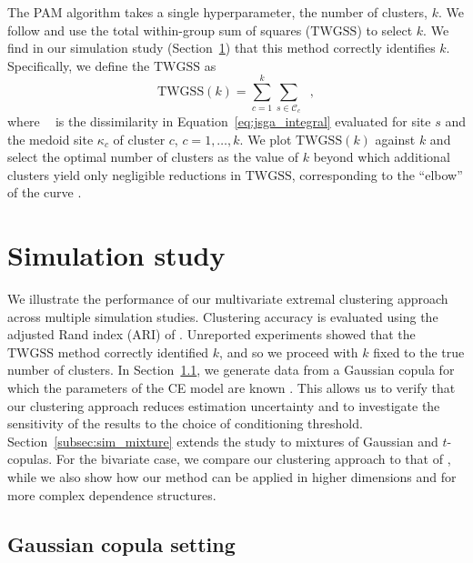 \documentclass[preprint,12pt,authoryear]{elsarticle}
\newcommand{\eJSGa}[1]{\mathop{\mathrm{eJS}_{i, #1}^{\mathrm{G}_{\lambda}}}\nolimits}
\begin{document}
The PAM algorithm takes a single hyperparameter, the number of clusters, $k$.
We follow \citet{Thorndike1953-ie} and use the total within-group sum of squares ($\mathrm{TWGSS}$) to select $k$.
We find in our simulation study (Section~\ref{sec:sim}) that this method correctly identifies $k$.
Specifically, we define the $\mathrm{TWGSS}$ as
\begin{equation}\label{eq:twgss}
  \mathrm{TWGSS}(k) = \sum_{c=1}^{k} \sum_{s \in \mathcal{C}_c} \eJSGa{s, \kappa_c},
\end{equation}
where $\eJSGa{s, \kappa_c}$ is the dissimilarity in Equation~\eqref{eq:jsga_integral} evaluated for site $s$ and the medoid site $\kappa_c$ of cluster $c$, $c = 1, \ldots, k$.
We plot $\mathrm{TWGSS}(k)$ against $k$ and select the optimal number of clusters as the value of $k$ beyond which additional clusters yield only negligible reductions in $\mathrm{TWGSS}$, corresponding to the ``elbow'' of the curve \citep{Hastie2009}.

\section{Simulation study}
\label{sec:sim}

We illustrate the performance of our multivariate extremal clustering approach across multiple simulation studies. 
Clustering accuracy is evaluated using the adjusted Rand index (ARI) of \citet{Hubert1985-ys}. 
Unreported experiments showed that the $\mathrm{TWGSS}$ method correctly identified $k$, and so we proceed with $k$ fixed to the true number of clusters.
In Section~\ref{subsec:sim_gauss}, we generate data from a Gaussian copula for which the parameters of the CE model are known \citep{Keef2013}.
This allows us to verify that our clustering approach reduces estimation uncertainty and to investigate the sensitivity of the results to the choice of conditioning threshold.
Section~\ref{subsec:sim_mixture} extends the study to mixtures of Gaussian and $t$-copulas.
For the bivariate case, we compare our clustering approach to that of \citet{Vignotto2021}, while we also show how our method can be applied in higher dimensions and for more complex dependence structures.

\subsection{Gaussian copula setting}
\label{subsec:sim_gauss}
\end{document}
